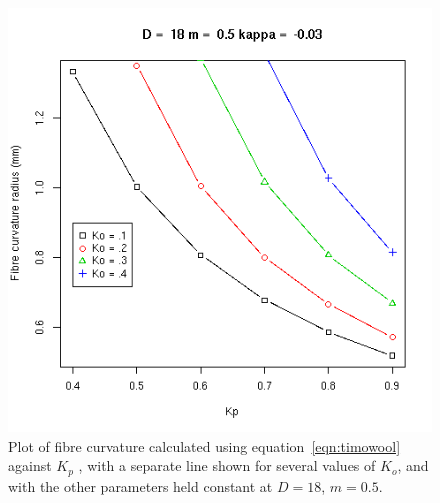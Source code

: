 %

\begin{figure}[!h]
  \centering
  \includegraphics[width=1.0\textwidth]{RvsKpm5.png}
 \caption{Plot of fibre curvature calculated using equation~\ref{eqn:timowool} against $K_{p}$ , with a separate line shown for several values of $K_{o}$, and with the other parameters held constant at $D=18$, $m=0.5$.}
  \label{fig:curvkp}
\end{figure}

%

